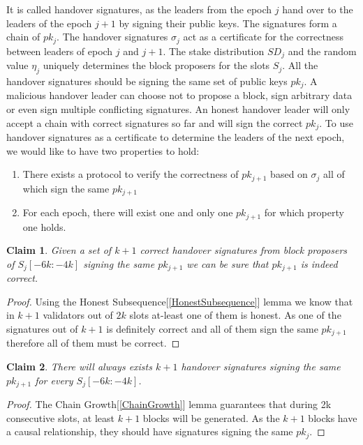 \documentclass[a4paper,11pt,oneside]{article}
\newtheorem{claim}{Claim}
\theoremstyle{definition}
\begin{document}
    It is called handover signatures, as the leaders from the epoch $j$ hand over to the leaders of the epoch $j + 1$ by signing their public keys. The signatures form a chain of $pk_j$. The handover signatures $\sigma_j$ act as a certificate for the correctness between leaders of epoch $j$ and $j + 1$. The stake distribution $SD_j$ and the random value ${\eta}_j$ uniquely determines the block proposers for the slots $S_j$. All the handover signatures should be signing the same set of public keys $pk_j$. A malicious handover leader can choose not to propose a block, sign arbitrary data or even sign multiple conflicting signatures. An honest handover leader will only accept a chain with correct signatures so far and will sign the correct $pk_j$. To use handover signatures as a certificate to determine the leaders of the next epoch, we would like to have two properties to hold:
    \begin{enumerate}
        \item There exists a protocol to verify the correctness of $pk_{j+1}$ based on $\sigma_j$ all of which sign the same $pk_{j+1}$
        \item For each epoch, there will exist one and only one $pk_{j+1}$ for which property one holds.
    \end{enumerate}
  
  \begin{claim}
  Given a set of $k + 1$ correct handover signatures from block proposers of $S_j[-6k:-4k]$ signing the same $pk_{j+1}$ we can be sure that $pk_{j + 1}$ is indeed correct.
  \end{claim}
  \begin{proof}
  Using the Honest Subsequence[\ref{HonestSubsequence}] lemma we know that in $k + 1$ validators out of $2k$ slots at-least one of them is honest. As one of the signatures out of $k + 1$ is definitely correct and all of them sign the same $pk_{j + 1}$ therefore all of them must be correct.    
  \end{proof}
  
  \begin{claim}
  There will always exists $k + 1$ handover signatures signing the same $pk_{j + 1}$ for every $S_j[-6k:-4k]$.
  \end{claim}
  
  \begin{proof}
  The Chain Growth[\ref{ChainGrowth}] lemma guarantees that during 2k consecutive slots, at least $k + 1$ blocks will be generated. As the $k + 1$ blocks have a causal relationship, they should have signatures signing the same $pk_j$.
  \end{proof}
  
\end{document}
